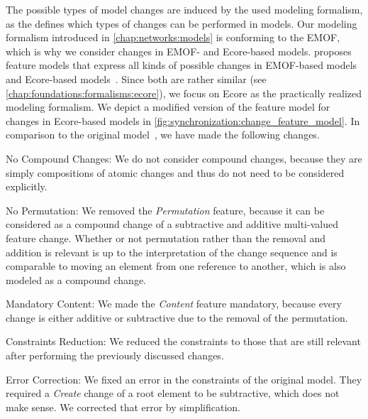 The possible types of model changes are induced by the used modeling formalism, as the \metametamodel defines which types of changes can be performed in models.
Our modeling formalism introduced in \autoref{chap:networks:models} is conforming to the \gls{EMOF}, which is why we consider changes in \gls{EMOF}- and Ecore-based models.
\citeauthor{kramer2017a} proposes feature models that express all kinds of possible changes in \gls{EMOF}-based models~\cite[Fig. 5.2]{kramer2017a} and Ecore-based models~\cite[Fig.~5.3]{kramer2017a}.
Since both are rather similar (see \autoref{chap:foundations:formalisms:ecore}), we focus on Ecore as the practically realized modeling formalism.
We depict a modified version of the feature model for changes in Ecore-based models in \autoref{fig:synchronization:change_feature_model}.
In comparison to the original model~\cite[Fig. 5.3]{kramer2017a}, we have made the following changes.
\begin{properdescription}
    \item[No Compound Changes:] We do not consider compound changes, because they are simply compositions of atomic changes and thus do not need to be considered explicitly.
    \item[No Permutation:] We removed the \emph{Permutation} feature, because it can be considered as a compound change of a subtractive and additive multi-valued feature change. Whether or not permutation rather than the removal and addition is relevant is up to the interpretation of the change sequence and is comparable to moving an element from one reference to another, which is also modeled as a compound change.
    \item[Mandatory Content:] We made the \emph{Content} feature mandatory, because every change is either additive or subtractive due to the removal of the permutation.
    \item[Constraints Reduction:] We reduced the constraints to those that are still relevant after performing the previously discussed changes.
    \item[Error Correction:] We fixed an error in the constraints of the original model. They required a \emph{Create} change of a root element to be subtractive, which does not make sense. We corrected that error by simplification.
\end{properdescription}

